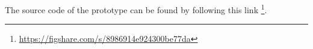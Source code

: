 	The source code of the prototype can be found by following this link \footnote{\url{https://figshare.com/s/8986914e924300be77da}}.
	
